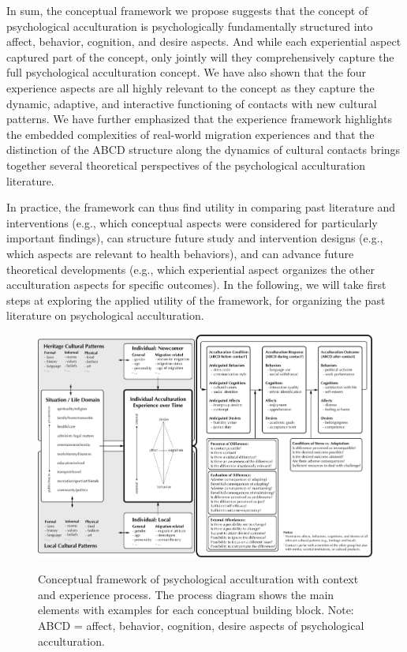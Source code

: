 \documentclass[man, 12pt, a4paper, mask]{apa7}
\begin{document}
In sum, the conceptual framework we propose suggests that the concept of psychological acculturation is psychologically fundamentally structured into affect, behavior, cognition, and desire aspects. And while each experiential aspect captured part of the concept, only jointly will they comprehensively capture the full psychological acculturation concept. We have also shown that the four experience aspects are all highly relevant to the concept as they capture the dynamic, adaptive, and interactive functioning of contacts with new cultural patterns. We have further emphasized that the experience framework highlights the embedded complexities of real-world migration experiences and that the distinction of the ABCD structure along the dynamics of cultural contacts brings together several theoretical perspectives of the psychological acculturation literature. 

In practice, the framework can thus find utility in comparing past literature and interventions (e.g., which conceptual aspects were considered for particularly important findings), can structure future study and intervention designs (e.g., which aspects are relevant to health behaviors), and can advance future theoretical developments (e.g., which experiential aspect organizes the other acculturation aspects for specific outcomes). In the following, we will take first steps at exploring the applied utility of the framework, for organizing the past literature on psychological acculturation. 

\begin{figure}
    \centering
    \caption{Conceptual framework of psychological acculturation with context and experience process. The process diagram shows the main elements with examples for each conceptual building block. Note: ABCD = affect, behavior, cognition, desire aspects of psychological acculturation.}
    \includegraphics[width=\textwidth]{Figures/ConceptualFrameworkRevision.pdf}
    \label{fig:ModelContext}
\end{figure}
\end{document}
